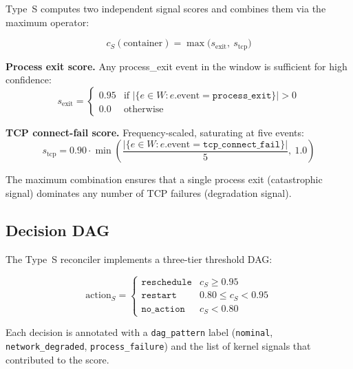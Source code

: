 \documentclass[runningheads]{llncs}
\begin{document}
Type~S computes two independent signal scores and combines them via
the maximum operator:

\begin{equation}
  c_S(\text{container}) = \max\bigl(s_\text{exit},\ s_\text{tcp}\bigr)
  \label{eq:score_s}
\end{equation}

\noindent\textbf{Process exit score.}  Any process\_exit event in the
window is sufficient for high confidence:
\begin{equation}
  s_\text{exit} =
  \begin{cases}
    0.95 & \text{if } |\{e \in W : e.\text{event} = \texttt{process\_exit}\}| > 0 \\
    0.0  & \text{otherwise}
  \end{cases}
  \label{eq:score_exit}
\end{equation}

\noindent\textbf{TCP connect-fail score.}  Frequency-scaled, saturating at
five events:
\begin{equation}
  s_\text{tcp} = 0.90 \cdot \min\!\left(\frac{|\{e \in W :
    e.\text{event}=\texttt{tcp\_connect\_fail}\}|}{5},\ 1.0\right)
  \label{eq:score_tcp}
\end{equation}

The maximum combination ensures that a single process exit
(catastrophic signal) dominates any number of TCP failures
(degradation signal).

\subsection{Decision DAG}

The Type~S reconciler implements a three-tier threshold DAG:

\begin{equation}
  \text{action}_S =
  \begin{cases}
    \texttt{reschedule} & c_S \geq 0.95 \\
    \texttt{restart}    & 0.80 \leq c_S < 0.95 \\
    \texttt{no\_action} & c_S < 0.80
  \end{cases}
  \label{eq:dag_s}
\end{equation}

Each decision is annotated with a \texttt{dag\_pattern} label
(\texttt{nominal}, \texttt{network\_degraded}, \texttt{process\_failure})
and the list of kernel signals that contributed to the score.

\end{document}
